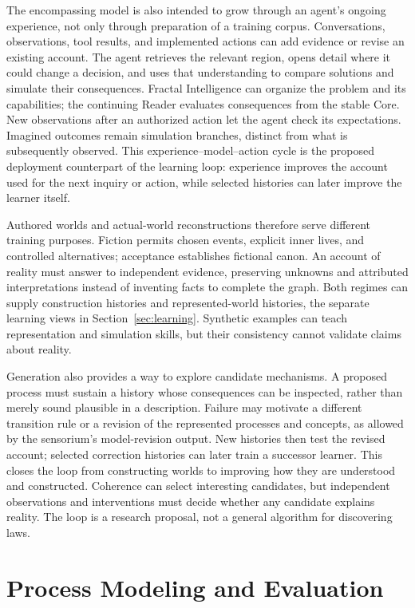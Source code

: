 \documentclass[10pt]{article}
\begin{document}
The encompassing model is also intended to grow through an agent's ongoing
experience, not only through preparation of a training corpus. Conversations,
observations, tool results, and implemented actions can add evidence or revise
an existing account. The agent retrieves the relevant region, opens detail
where it could change a decision, and uses that understanding to compare
solutions and simulate their consequences. Fractal Intelligence can organize
the problem and its capabilities; the continuing Reader evaluates consequences
from the stable Core. New observations after an authorized action let the agent
check its expectations. Imagined outcomes remain simulation branches,
distinct from what is subsequently observed. This experience--model--action
cycle is the proposed deployment counterpart of the learning loop:
experience improves the account used for the next inquiry or action, while
selected histories can later improve the learner itself.

Authored worlds and actual-world reconstructions therefore serve different
training purposes. Fiction permits chosen events, explicit inner lives, and
controlled alternatives; acceptance establishes fictional canon. An account
of reality must answer to independent evidence, preserving unknowns and
attributed interpretations instead of inventing facts to complete the graph.
Both regimes can supply construction histories and represented-world
histories, the separate learning views in Section~\ref{sec:learning}.
Synthetic examples can teach representation and simulation skills, but their
consistency cannot validate claims about reality.

Generation also provides a way to explore candidate mechanisms. A proposed
process must sustain a history whose consequences can be inspected, rather
than merely sound plausible in a description. Failure may motivate a different
transition rule or a revision of the represented processes and concepts, as
allowed by the sensorium's model-revision output. New histories then test the
revised account; selected correction histories can later train a successor
learner. This closes the loop from constructing worlds to improving how they
are understood and constructed. Coherence can select interesting candidates,
but independent observations and interventions must decide whether any
candidate explains reality. The loop is a research proposal, not a general
algorithm for discovering laws.

\section{Process Modeling and Evaluation}
\label{sec:evaluation}
\end{document}
